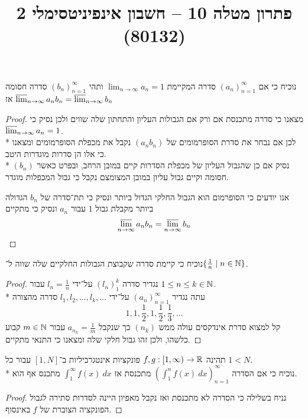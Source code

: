 
\usepackage{tikz}
\DeclareMathOperator\arcsinh{arcsinh}
\title{פתרון מטלה 10 – חשבון אינפיניטסימלי 2 (80132)}


\maketitle
\maketitleprint{}

\Question{}
\Subquestion{}
נוכיח כי אם ${(a_n)}_{n = 1}^\infty$ סדרה המקיימת $\lim_{n \to \infty} a_n = 1$ ותהי ${(b_n)}_{n = 1}^\infty$ סדרה חסומה אז $\operatorname*{\overline{lim}}_{n \to \infty} a_n b_n = \operatorname*{\overline{lim}}_{n \to \infty} b_n$
\begin{proof}
	מצאנו כי סדרה מתכנסת אם ורק אם הגבולות העליון והתחתון שלה שווים ולכן נסיק כי $\operatorname*{\overline{lim}}_{n \to \infty} a_n = 1$. \\*
	לכן אם נבחר את סדרת הסופרמומים של $(a_n b_n)$ נקבל את מכפלת הסופרמומים ומצאנו כי אלו הן סדרות מוגדרות היטב. \\*
	נסיק אם כן שהגבול העליון של מכפלת הסדרות קיים במובן הרחב, ובפרט כאשר $(b_n)$ חסומה וקיים גבול עליון במובן המצומצם נקבל כי גבול המכפלות מוגדר.

	אנו יודעים כי הסופרמום הוא הגבול החלקי הגדול ביותר ונסיק כי תת־סדרה של $b_n$ הגדולה ביותר מקבלת גבול $1$ עבור $a_n$ ונסיק כי מתקיים
	\[
		\operatorname*{\overline{lim}}_{n \to \infty} a_n b_n = \operatorname*{\overline{lim}}_{n \to \infty} b_n
	\]
\end{proof}

\Subquestion{}
נוכיח כי קיימת סדרה שקבוצת הגבולות החלקיים שלה שווה ל־$\{ \frac{1}{n} \mid n \in \mathbb{N} \}$.
\begin{proof}
	נגדיר סדרה ${(l_n)}_1^k$ על־ידי $l_n = \frac{1}{n}$ עבור $1 \le n \le k \in \mathbb{N}$. \\*
	עתה נגדיר ${(a_n)}_{n = 1}^\infty$ על־ידי $l_1, l_2, \dots, l_k, \dots$ סדרה מהצורה
	\[
		1,
		1, \frac{1}{2},
		1, \frac{1}{2}, \frac{1}{3},
		\dots
	\]
	קל למצוא סדרת אינדקסים עולה ממש $(n_k)$ כך שנקבל $a_{n_k} = \frac{1}{m}$ עבור $m \in \mathbb{N}$ קבוע כלשהו, ולכן זהו גבול חלקי שלה ומצאנו כי התנאי מתקיים.
\end{proof}

\Question{}
תהינה $f, g : [1, \infty) \to \mathbb{R}$ פונקציות אינטגרביליות ב־$[1, N]$ עבור כל $1 < N$. \\*
נוכיח כי אם הסדרה ${( \int_{1}^{n} f(x)\ dx)}_{n = 1}^\infty$ מתכנסת אז $\int_{1}^{\infty} f(x)\ dx$ מתכנס אף הוא.
\begin{proof}
	נניח בשלילה כי הסדרה לא מתכנסת ואז נקבל מאפיון היינה לסדרות סתירה לגבול הפונקציה הצוברת של $f$ באינסוף.
\end{proof}

